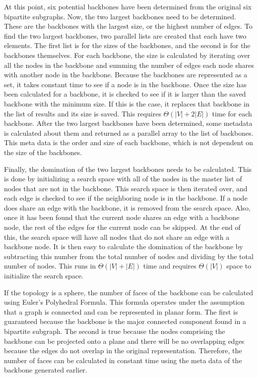 \documentclass{article}
\begin{document}
        \par
        At this point, six potential backbones have been determined from the original six bipartite subgraphs. Now, the two largest backbones need to be determined. These are the backbones with the largest size, or the highest number of edges. To find the two largest backbones, two parallel lists are created that each have two elements. The first list is for the sizes of the backbones, and the second is for the backbones themselves. For each backbone, the size is calculated by iterating over all the nodes in the backbone and summing the number of edges each node shares with another node in the backbone. Because the backbones are represented as a set, it takes constant time to see if a node is in the backbone. Once the size has been calculated for a backbone, it is checked to see if it is larger than the saved backbone with the minimum size. If this is the case, it replaces that backbone in the list of results and its size is saved. This requires $\Theta(|V| + 2|E|)$ time for each backbone. After the two largest backbones have been determined, some metadata is calculated about them and returned as a parallel array to the list of backbones. This meta data is the order and size of each backbone, which is not dependent on the size of the backbones.
        \par
        Finally, the domination of the two largest backbones needs to be calculated. This is done by initializing a search space with all of the nodes in the master list of nodes that are not in the backbone. This search space is then iterated over, and each edge is checked to see if the neighboring node is in the backbone. If a node does share an edge with the backbone, it is removed from the search space. Also, once it has been found that the current node shares an edge with a backbone node, the rest of the edges for the current node can be skipped. At the end of this, the search space will have all nodes that do not share an edge with a backbone node. It is then easy to calculate the domination of the backbone by subtracting this number from the total number of nodes and dividing by the total number of nodes. This runs in $\Theta(|V| + |E|)$ time and requires $\Theta(|V|)$ space to initialize the search space.
        \par
        If the topology is a sphere, the number of faces of the backbone can be calculated using Euler's Polyhedral Formula. This formula operates under the assumption that a graph is connected and can be represented in planar form. The first is guaranteed because the backbone is the major connected component found in a bipartite subgraph. The second is true because the nodes comprising the backbone can be projected onto a plane and there will be no overlapping edges because the edges do not overlap in the original representation. Therefore, the number of faces can be calculated in constant time using the meta data of the backbone generated earlier.
\end{document}
